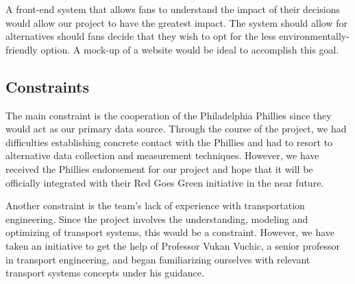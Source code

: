 A front-end system that allows fans to understand the impact of their
decisions would allow our project to have the greatest impact. The
system should allow for alternatives should fans decide that they wish
to opt for the less environmentally-friendly option. A mock-up of a
website would be ideal to accomplish this goal.

\subsection{Constraints}
The main constraint is the cooperation of the Philadelphia Phillies
since they would act as our primary data source. Through the course of
the project, we had difficulties establishing concrete contact with
the Phillies and had to resort to alternative data collection and
measurement techniques. However, we have received the Phillies
endorsement for our project and hope that it will be officially
integrated with their Red Goes Green initiative in the near future.

Another constraint is the team's lack of experience with
transportation engineering. Since the project involves the
understanding, modeling and optimizing of transport systems, this
would be a constraint. However, we have taken an initiative to get the
help of Professor Vukan Vuchic, a senior professor in transport
engineering, and began familiarizing ourselves with relevant transport
systems concepts under his guidance.
